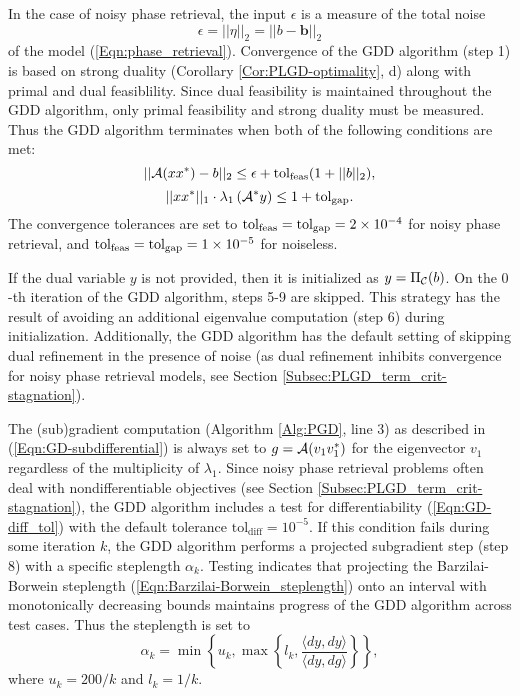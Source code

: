In the case of noisy phase retrieval, the input $\epsilon$ is a measure of the total noise \[
\epsilon = ||\eta||_2 = ||b - \mathbf{b}||_2 
\] of the model (\ref{Eqn:phase_retrieval}).  Convergence of the GDD algorithm (step 1) is based on strong duality (Corollary \ref{Cor:PLGD-optimality}, d) along with primal and dual feasiblility. Since dual feasibility is maintained throughout the GDD algorithm, only primal feasibility and strong duality must be measured.  Thus the GDD algorithm terminates when both of the following conditions are met:
\begin{equation} \label{Eqn:saga_conv_crit_primal}
|| {\mathcal A}(xx^*) - b ||_2 \leq \epsilon + \textnormal{tol}_\textnormal{feas} (1 + ||b||_2),
\end{equation}
\begin{equation} \label{Eqn:saga_conv_crit_gap}
 ||xx^*||_1 \cdot \lambda_1 \left( {\mathcal A}^* y \right)  \leq 1 +  \textnormal{tol}_\textnormal{gap}.
\end{equation}
The convergence tolerances are set to $ \textnormal{tol}_\textnormal{feas} = \textnormal{tol}_\textnormal{gap} = 2 \times 10^{-4}$ for noisy phase retrieval, and $ \textnormal{tol}_\textnormal{feas} = \textnormal{tol}_\textnormal{gap} = 1 \times 10^{-5}$ for noiseless.


If the dual variable $y$ is not provided, then it is initialized as $y= \Pi_{\mathcal C}(b)$.  On the $0$-th iteration of the GDD algorithm, steps 5-9 are skipped.  This strategy has the result of avoiding an additional eigenvalue computation (step 6) during initialization.  Additionally, the GDD algorithm has the default setting of skipping dual refinement in the presence of noise (as dual refinement inhibits convergence for noisy phase retrieval models, see Section \ref{Subsec:PLGD_term_crit-stagnation}).


The (sub)gradient computation (Algorithm \ref{Alg:PGD}, line 3) as described in (\ref{Eqn:GD-subdifferential}) is always set to $g = {\mathcal A}(v_1v_1^*)$ for the eigenvector $v_1$ regardless of the multiplicity of $\lambda_1$.  Since noisy phase retrieval problems often deal with nondifferentiable objectives (see Section \ref{Subsec:PLGD_term_crit-stagnation}), the GDD algorithm includes a test for differentiability (\ref{Eqn:GD-diff_tol}) with the default tolerance $\text{tol}_\text{diff} = 10^{-5}$.  If this condition fails during some iteration $k$, the GDD algorithm performs a projected subgradient step (step 8) with a specific steplength $\alpha_k$.  Testing indicates that projecting the Barzilai-Borwein steplength (\ref{Eqn:Barzilai-Borwein_steplength}) onto an interval with monotonically decreasing bounds maintains progress of the GDD algorithm across test cases.  Thus the steplength is set to
\begin{equation} 			\label{Eqn:GD-steplength}
\alpha_k = \min \left\{ u_k, \max \left\{ l_k, \frac{\langle dy, dy \rangle}{\langle dy, dg \rangle} \right\} \right\},
\end{equation}
where $u_k = 200/k$ and $l_k = 1/k$.


